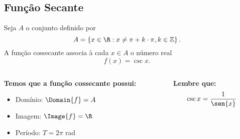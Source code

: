 \subsection{Função Secante}
\begin{frame}[t]
  \begin{definition}
    Seja $A$ o conjunto definido por
    \begin{equation*}
      A=\left\{x\in\R : x\not= \pi + k\cdot\pi, k\in\mathbb{Z}\right\}.
    \end{equation*}
    A função cossecante associa à cada $x\in A$ o número real
    \begin{equation*}
      f(x)=\csc{x}.
    \end{equation*}
  \end{definition}
  \begin{columns}[onlytextwidth]
    \begin{column}{0.49\textwidth}
      \begin{highlight}
        \textbf{Temos que a função cossecante possui:}
        \begin{itemize}
          \item Domínio: $\Domain{f} = A$
          \item Imagem: $\Image{f} = \R$
          \item Período: $T = 2\pi$ rad
        \end{itemize}
      \end{highlight}
    \end{column}
    \begin{column}{0.49\textwidth}
      \begin{highlight}
        \textbf{Lembre que:}
        \begin{equation*}
          \csc{x} = \frac{1}{\sen{x}}
        \end{equation*}
      \end{highlight}
    \end{column}
  \end{columns}
\end{frame}

\begin{frame}[c]
  \begin{figure}
  \end{figure}
\end{frame}